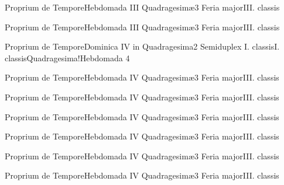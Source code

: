 \documentclass[liber-responsorialis_temporale.tex]{subfiles}
\begin{document}
	{Proprium de Tempore}{Hebdomada III Quadragesimæ}{3}{}
	{Feria major}{III. classis}{}
	{}
	{}

	{Proprium de Tempore}{Hebdomada III Quadragesimæ}{3}{}
	{Feria major}{III. classis}{}
	{}
	{}

	{Proprium de Tempore}{Dominica IV in Quadragesima}{2}{}
	{Semiduplex I. classis}{I. classis}{Quadragesima!Hebdomada 4}
	{}
	{}

	{Proprium de Tempore}{Hebdomada IV Quadragesimæ}{3}{}
	{Feria major}{III. classis}{}
	{}
	{}

	{Proprium de Tempore}{Hebdomada IV Quadragesimæ}{3}{}
	{Feria major}{III. classis}{}
	{}
	{}

	{Proprium de Tempore}{Hebdomada IV Quadragesimæ}{3}{}
	{Feria major}{III. classis}{}
	{}
	{}

	{Proprium de Tempore}{Hebdomada IV Quadragesimæ}{3}{}
	{Feria major}{III. classis}{}
	{}
	{}

	{Proprium de Tempore}{Hebdomada IV Quadragesimæ}{3}{}
	{Feria major}{III. classis}{}
	{}
	{}

	{Proprium de Tempore}{Hebdomada IV Quadragesimæ}{3}{}
	{Feria major}{III. classis}{}
	{}
	{}
\end{document}
